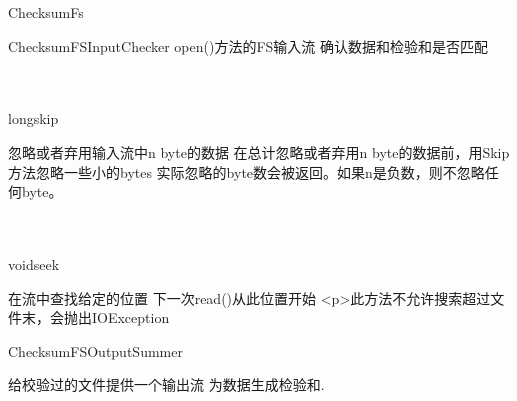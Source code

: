 \begin{XeClass}{ChecksumFs}
\begin{XeInnerClass}{ChecksumFSInputChecker}
 open()方法的FS输入流
 确认数据和检验和是否匹配

    \begin{XeMethod}{\XePublic\\ \XeSync\\ }{long}{skip}
         
 忽略或者弃用输入流中n byte的数据
 在总计忽略或者弃用n byte的数据前，用Skip方法忽略一些小的bytes
 实际忽略的byte数会被返回。如果n是负数，则不忽略任何byte。

    \end{XeMethod}

    \begin{XeMethod}{\XePublic\\ \XeSync\\ }{void}{seek}
         
 在流中查找给定的位置
 下一次read()从此位置开始
 <p>此方法不允许搜索超过文件末，会抛出IOException

    \end{XeMethod}

  \end{XeInnerClass}
  \begin{XeInnerClass}{ChecksumFSOutputSummer}
     
 给校验过的文件提供一个输出流
 为数据生成检验和.

  \end{XeInnerClass}
\end{XeClass}
